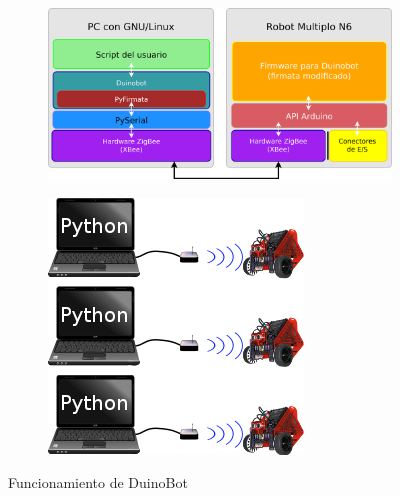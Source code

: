 \begin{figure}
    \centering
    \begin{subfigure}[b]{0.7\textwidth}
        \includegraphics[width=.95\textwidth]{figures/diagrama_duinobot}
        \label{fig:funcionamiento_duinobot_diagrama}
    \end{subfigure}
    \begin{subfigure}[b]{0.29\textwidth}
        \includegraphics[width=\textwidth]{figures/arquitectura_actual}
        \label{fig:funcionamiento_duinobot_conexion}
    \end{subfigure}
    \caption{Funcionamiento de DuinoBot}
    \label{fig:funcionamiento_duinobot}
\end{figure}

